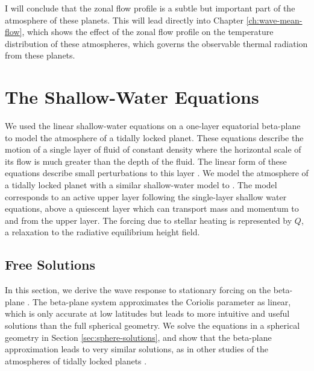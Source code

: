 
I will conclude that the zonal flow profile is a subtle but important part of the atmosphere of these planets. This will  lead directly into Chapter \ref{ch:wave-mean-flow}, which shows the effect of the zonal flow profile on the temperature distribution of these atmospheres, which governs the observable thermal radiation from these planets.


\section{The Shallow-Water Equations}\label{sec:shallow-water}

We used the linear shallow-water equations on a one-layer equatorial beta-plane to model the atmosphere of a tidally locked planet. These equations describe the motion of a single layer of fluid of constant density where the horizontal scale of its flow is much greater than the depth of the fluid. The linear form of these equations describe small perturbations to this layer \citep{vallis2006book}. We model the atmosphere of a tidally locked planet with a similar shallow-water model to \citet{showman2011superrotation}. The model corresponds to an active upper layer following the single-layer shallow water equations, above a quiescent layer which can transport mass and momentum to and from the upper layer. The forcing due to stellar heating is represented by $Q$, a relaxation to the radiative equilibrium height field.

\subsection{Free Solutions}

In this section, we derive the wave response to stationary forcing on the beta-plane \citep{matsuno1966quasi}. The beta-plane system approximates the Coriolis parameter as linear, which is only accurate at low latitudes but leads to more intuitive and useful solutions than the full spherical geometry. We solve the equations in a spherical geometry in Section \ref{sec:sphere-solutions}, and show that the beta-plane approximation leads to very similar solutions, as in other studies of the atmospheres of tidally locked planets \citep{showman2011superrotation} \citep{heng2014analytical}.

